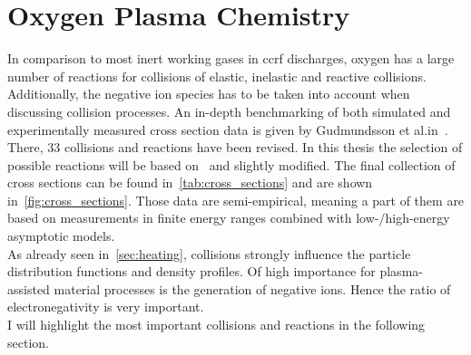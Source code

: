 %
	\section{Oxygen Plasma Chemistry}\label{sec:negionphysics}
%
		In comparison to most inert working gases in ccrf discharges, oxygen has a large number of reactions for collisions of elastic, inelastic and reactive collisions. Additionally, the negative ion species has to be taken into account when discussing collision processes. An in-depth benchmarking of both simulated and experimentally measured cross section data is given by Gudmundsson et al.\@ in~\cite{Gudmundsson13}. There, 33 collisions and reactions have been revised. In this thesis the selection of possible reactions will be based on~\cite{Bronold07b} and slightly modified. The final collection of cross sections can be found in~\autoref{tab:cross_sections} and are shown  in~\autoref{fig:cross_sections}. Those data are semi-empirical, meaning a part of them are based on measurements in finite energy ranges combined with low-/high-energy asymptotic models.\\
		As already seen in~\autoref{sec:heating}, collisions strongly influence the particle distribution functions and density profiles. Of high importance for plasma-assisted material processes is the generation of negative ions. Hence the ratio of electronegativity is very important.\\
		I will highlight the most important collisions and reactions in the following section. 
%
